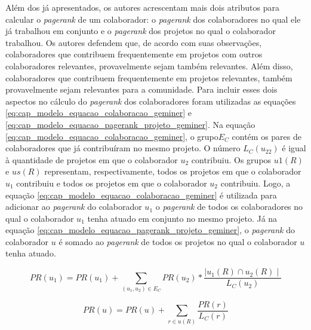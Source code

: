  Além dos já apresentados, os autores acrescentam mais dois atributos para calcular o \textit{pagerank} de um colaborador: o \textit{pagerank} dos colaboradores no qual ele já trabalhou em conjunto e o \textit{pagerank} dos projetos no qual o colaborador trabalhou. Os autores defendem que, de acordo com suas observações, colaboradores que contribuem frequentemente em projetos com outros colaboradores relevantes, provavelmente sejam também relevantes. Além disso, colaboradores que contribuem frequentemente em projetos relevantes, também provavelmente sejam relevantes para a comunidade.  Para incluir esses dois aspectos no cálculo do \textit{pagerank} dos colaboradores foram utilizadas as equações \ref{eq:cap_modelo_equacao_colaboracao_geminer} e \ref{eq:cap_modelo_equacao_pagerank_projeto_geminer}. Na equação  \ref{eq:cap_modelo_equacao_colaboracao_geminer}, o grupo$ E_C$ contém os pares de colaboradores que já  contribuíram no mesmo projeto. O número $L_C(u_22)$  é igual à quantidade de projetos em que o colaborador $u_2$ contribuiu. Os grupos $u1(R)$ e $us(R)$ representam, respectivamente, todos os projetos em que o colaborador $u_1$ contribuiu e  todos os projetos em que o colaborador $u_2$ contribuiu. Logo, a equação \ref{eq:cap_modelo_equacao_colaboracao_geminer}  é utilizada para adicionar ao \textit{pagerank} do colaborador $u_1$ o \textit{pagerank} de todos os colaboradores no qual o colaborador $u_1$ tenha atuado em conjunto no mesmo projeto. Já na equação \ref{eq:cap_modelo_equacao_pagerank_projeto_geminer}, o \textit{pagerank} do colaborador $u$ é somado ao \textit{pagerank} de todos os projetos no qual o colaborador $u$ tenha atuado.
 


\begin{equation}
\label{eq:cap_modelo_equacao_colaboracao_geminer}
PR(u_1) =  PR(u_1) +   \sum_{(u_1,u_2) \in E_C}  PR(u_2) * \frac{\mid u_1(R) \cap u_2(R)\mid}{L_C(u_2)}
\end{equation}

\begin{equation}
\label{eq:cap_modelo_equacao_pagerank_projeto_geminer}
PR(u) = PR(u) +    \sum_{r  \in u(R) }  \frac{PR(r)}{L_C(r)}
\end{equation}



